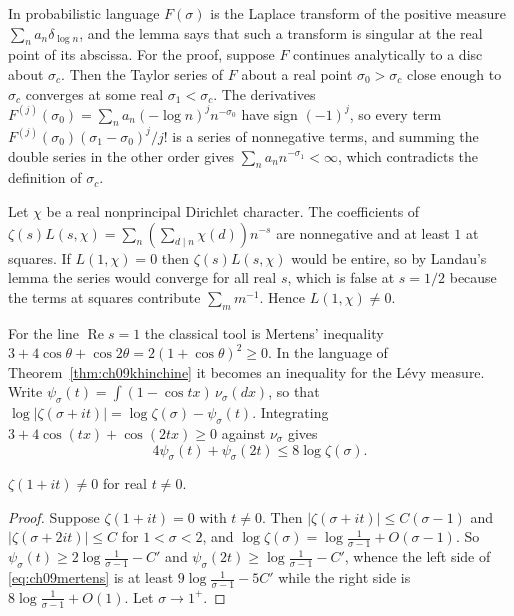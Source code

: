In probabilistic language $F(\sigma)$ is the Laplace transform of the positive measure $\sum_n a_n\delta_{\log n}$, and the lemma says that such a transform is singular at the real point of its abscissa. For the proof, suppose $F$ continues analytically to a disc about $\sigma_c$. Then the Taylor series of $F$ about a real point $\sigma_0>\sigma_c$ close enough to $\sigma_c$ converges at some real $\sigma_1<\sigma_c$. The derivatives $F^{(j)}(\sigma_0) = \sum_n a_n(-\log n)^j n^{-\sigma_0}$ have sign $(-1)^j$, so every term $F^{(j)}(\sigma_0)(\sigma_1-\sigma_0)^j/j!$ is a series of nonnegative terms, and summing the double series in the other order gives $\sum_n a_n n^{-\sigma_1}<\infty$, which contradicts the definition of $\sigma_c$.

\begin{example}
Let $\chi$ be a real nonprincipal Dirichlet character. The coefficients of $\zeta(s)L(s,\chi) = \sum_n (\sum_{d\mid n}\chi(d)) n^{-s}$ are nonnegative and at least $1$ at squares. If $L(1,\chi)=0$ then $\zeta(s)L(s,\chi)$ would be entire, so by Landau's lemma the series would converge for all real $s$, which is false at $s=1/2$ because the terms at squares contribute $\sum_m m^{-1}$. Hence $L(1,\chi)\ne 0$.
\end{example}

For the line $\operatorname{Re} s = 1$ the classical tool is Mertens' inequality $3 + 4\cos\theta + \cos 2\theta = 2(1+\cos\theta)^2 \ge 0$. In the language of Theorem~\ref{thm:ch09khinchine} it becomes an inequality for the L\'evy measure. Write $\psi_\sigma(t) = \int (1-\cos tx)\,\nu_\sigma(dx)$, so that $\log|\zeta(\sigma+it)| = \log\zeta(\sigma) - \psi_\sigma(t)$. Integrating $3+4\cos(tx)+\cos(2tx)\ge 0$ against $\nu_\sigma$ gives
\begin{equation}\label{eq:ch09mertens}
4\psi_\sigma(t) + \psi_\sigma(2t) \le 8\log\zeta(\sigma).
\end{equation}

\begin{theorem}
$\zeta(1+it)\ne 0$ for real $t\ne 0$.
\end{theorem}

\begin{proof}
Suppose $\zeta(1+it)=0$ with $t\ne0$. Then $|\zeta(\sigma+it)|\le C(\sigma-1)$ and $|\zeta(\sigma+2it)|\le C$ for $1<\sigma<2$, and $\log\zeta(\sigma) = \log\frac{1}{\sigma-1} + O(\sigma-1)$. So $\psi_\sigma(t) \ge 2\log\frac1{\sigma-1} - C'$ and $\psi_\sigma(2t) \ge \log\frac{1}{\sigma-1} - C'$, whence the left side of \eqref{eq:ch09mertens} is at least $9\log\frac{1}{\sigma-1} - 5C'$ while the right side is $8\log\frac{1}{\sigma-1} + O(1)$. Let $\sigma\to 1^+$.
\end{proof}

